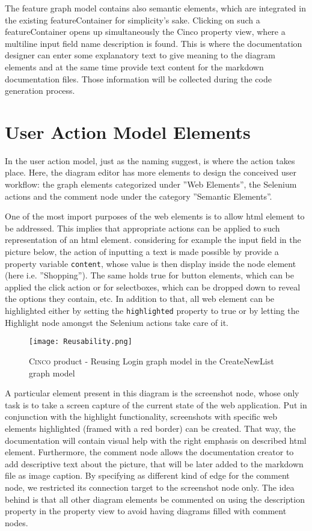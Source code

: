 The feature graph model contains also semantic elements, which are integrated in the existing featureContainer for simplicity's sake. Clicking on such a featureContainer opens up simultaneously the Cinco property view, where a multiline input field name description is found. This is where the documentation designer can enter some explanatory text to give meaning to the diagram elements and at the same time provide text content for the markdown documentation files. Those information will be collected during the code generation process.

\section{User Action Model Elements}\label{sec:DocModElem}
In the user action model, just as the naming suggest, is where the action takes place. Here, the diagram editor has more elements to design the conceived user workflow: the graph elements categorized under ''Web Elements'', the Selenium actions and the comment node under the category ''Semantic Elements''.

One of the most import purposes of the web elements is to allow \acrshort{html} element to be addressed. This implies that appropriate actions can be applied to such representation of an \acrshort{html} element. considering for example the input field in the picture below, the action of inputting a text is made possible by provide a property variable \lstinline{content}, whose value is then display inside the node element (here i.e. ''Shopping''). The same holds true for button elements, which can be applied the click action or for selectboxes, which can be dropped down to reveal the options they contain, etc. In addition to that, all web element can be highlighted either by setting the \lstinline{highlighted} property to true or by letting the Highlight node amongst the Selenium actions take care of it.

\begin{figure}[h]
    \centering
    \texttt{[image: Reusability.png]}
    \caption{\textsc{Cinco} product - Reusing Login graph model in the CreateNewList graph model}
    \label{fig:reusability}
\end{figure}

A particular element present in this diagram is the screenshot node, whose only task is to take a screen capture of the current state of the web application. Put in conjunction with the highlight functionality, screenshots with specific web elements highlighted (framed with a red border) can be created. That way, the documentation will contain visual help with the right emphasis on described \acrshort{html} element. Furthermore, the comment node allows the documentation creator to add descriptive text about the picture, that will be later added to the markdown file as image caption. By specifying as different kind of edge for the comment node, we restricted its connection target to the screenshot node only. The idea behind is that all other diagram elements be commented on using the description property in the property view to avoid having diagrams filled with comment nodes.

